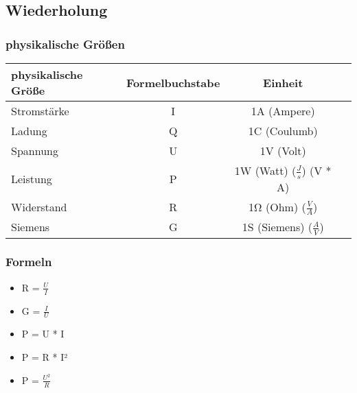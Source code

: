 \documentclass[../../main.tex]{subfiles}
\begin{document}
\subsection{Wiederholung}
\subsubsection{physikalische Größen}
\begin{tabular}[h]{l|c|c|c}
physikalische Größe & Formelbuchstabe & Einheit \\
\hline
Stromstärke & I & 1A (Ampere) \\
Ladung & Q & 1C (Coulumb) \\
Spannung & U & 1V (Volt) \\
Leistung & P & 1W (Watt) ($\frac{J}{s}$) (V * A) \\
Widerstand & R & 1\si{\ohm} (Ohm) ($\frac{V}{A}$) \\
Siemens & G & 1S (Siemens) ($\frac{A}{V}$)
\end{tabular}
\subsubsection{Formeln}
\begin{itemize}
    \item R = $\frac{U}{I}$
    \item G = $\frac{I}{U}$
    \item P = U * I
    \item P = R * I²
    \item P = $\frac{U^2}{R}$
\end{itemize}
\end{document}
